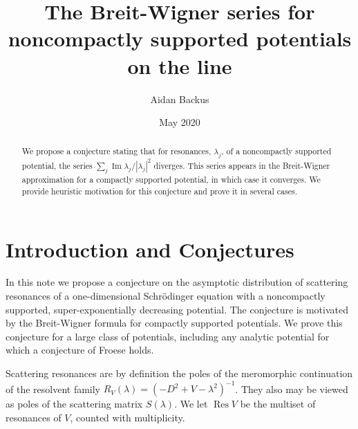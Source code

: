 \documentclass[reqno,12pt,letterpaper]{amsart}
\title[Noncompactly supported Breit-Wigner series]{The Breit-Wigner series for noncompactly supported potentials on the line}
\author{Aidan Backus}
\date{May 2020}
\DeclareMathOperator{\Res}{Res}
\DeclareMathOperator{\sgn}{sgn}
\renewcommand{\Im}{\operatorname{Im}}
\theoremstyle{definition}
\begin{document}
\begin{abstract}
We propose a conjecture stating that for resonances, $\lambda_j$, of a noncompactly supported potential, the series $\sum_j \Im \lambda_j/|\lambda_j|^2$ diverges. This series appears in the Breit-Wigner approximation for a compactly supported potential, in which case it converges. We provide heuristic motivation for this conjecture and prove it in several cases.
\end{abstract}

\maketitle

\section{Introduction and Conjectures}
In this note we propose a conjecture on the asymptotic distribution of scattering resonances of a one-dimensional Schr\"odinger equation with a noncompactly supported, super-exponentially decreasing potential. The conjecture is motivated by the Breit-Wigner formula for compactly supported potentials. We prove this conjecture for a large class of potentials, including any analytic potential for which a conjecture of Froese \cite[Conjecture 1.2]{froese1997asymptotic} holds.

Scattering resonances are by definition the poles of the meromorphic continuation of the resolvent family $R_V(\lambda) = (-D^2 + V - \lambda^2)^{-1}$. They also may be viewed as poles of the scattering matrix $S(\lambda)$.
We let $\Res V$ be the multiset of resonances of $V$, counted with multiplicity.
\end{document}
